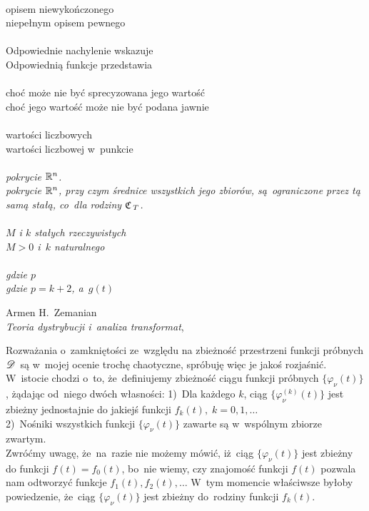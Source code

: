\documentclass[a4paper,11pt]{article}
\numberwithin{equation}{section}
\begin{document}
\noindent
{} \\
\Jest  opisem niewykończonego \\
\Powin niepełnym opisem pewnego \\
 \\
\Jest  Odpowiednie nachylenie wskazuje \\
\Powin Odpowiednią funkcje przedstawia \\
 \\
\Jest  choć może nie być sprecyzowana jego wartość \\
\Powin choć jego wartość może nie być podana jawnie \\
 \\
\Jest  wartości liczbowych \\
\Powin wartości liczbowej w~punkcie \\
 \\
\Jest  \textit{pokrycie $\mathbb{R}^{ n }$.} \\
\Powin \textit{pokrycie $\mathbb{R}^{ n }$, przy czym średnice wszystkich jego
  zbiorów, są~ograniczone przez tą samą stałą, co~dla rodziny
  $\mathfrak{C}_{ \hspace{0.17em} T }$.} \\
 \\
\Jest  \textit{$M$ i $k$ stałych rzeczywistych} \\
\Powin \textit{$M > 0$ i~$k$ naturalnego} \\
 \\
\Jest  \textit{gdzie $p$} \\
\Powin \textit{gdzie $p = k + 2$, a~$g( t )$} \\







\newpage

{ %
  Armen H.~Zemanian \\
  \textit{Teoria dystrybucji i~analiza transformat},
  \cite{ZemanianTeoriaDystrybucji1969}}




\noindent
{} Rozważania o~zamkniętości ze~względu na zbieżność
przestrzeni funkcji próbnych $\mathcal{D}$~są w~mojej ocenie trochę
chaotyczne, spróbuję więc je jakoś rozjaśnić. W~istocie chodzi o~to,
że~definiujemy zbieżność ciągu funkcji próbnych
$\{ \varphi_{ \nu }( t ) \}$, żądając od~niego dwóch własności:
1)~Dla każdego $k$, ciąg $\{ \varphi_{ \nu }^{ ( k ) }( t ) \}$ jest
zbieżny jednostajnie do jakiejś funkcji
$f_{ k }( t ), \; k = 0, 1, \ldots$ \\
2)~Nośniki wszystkich funkcji $\{ \varphi_{ \nu }( t ) \}$ zawarte są
w~wspólnym zbiorze zwartym. \\
Zwróćmy uwagę, że~na~razie nie możemy mówić, iż~ciąg
$\{ \varphi_{ \nu }( t ) \}$ jest zbieżny do funkcji
$f( t ) = f_{ 0 }( t )$, bo~nie wiemy, czy znajomość funkcji $f( t )$
pozwala nam odtworzyć funkcje $f_{ 1 }( t ), f_{ 2 }( t ), \ldots$ W~tym
momencie właściwsze byłoby powiedzenie, że~ciąg
$\{ \varphi_{ \nu }( t ) \}$ jest zbieżny do~rodziny funkcji
$f_{ k }( t )$.
\end{document}
